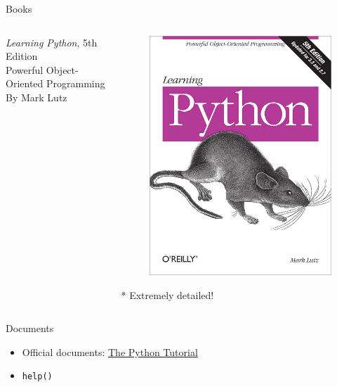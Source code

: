 \documentclass{../TexTemplate/myslide}
\begin{document}
\begin{frame}[fragile]{Books}
\begin{columns}
\begin{column}{0.5\linewidth}
\emph{Learning Python}, 5th Edition\\
Powerful Object-Oriented Programming\\
By Mark Lutz
\end{column}
\begin{column}{0.5\linewidth}
\begin{figure}
\centering
\includegraphics[width=0.8\linewidth]{fig/learning-python.jpg}
\end{figure}
* Extremely detailed!
\end{column}
\end{columns}
\end{frame}

\begin{frame}[fragile]{Documents}
\begin{itemize}
	\item Official documents: \href{https://docs.python.org/3.6/tutorial/index.html}{The Python Tutorial}
	\item \verb'help()'
\end{itemize}
\end{frame}
\end{document}
